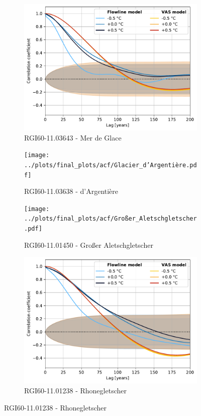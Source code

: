 \begin{figure}[htp]
        \begin{subfigure}[b]{0.48\textwidth}
          \caption{RGI60-11.03643 - Mer de Glace}
          \label{fig:acf:mer_de_glace}
          \centering
          \includegraphics[width=\textwidth]{../plots/final_plots/acf/Mer_de_Glace.pdf}
        \end{subfigure}
        \hfill
        \begin{subfigure}[b]{0.48\textwidth}
          \caption{RGI60-11.03638 - d'Argentière}
          \label{fig:acf:glacier_d_argentiere}
          \centering
          \texttt{[image: ../plots/final\_plots/acf/Glacier\_d'Argentière.pdf]}
        \end{subfigure}

        \begin{subfigure}[b]{0.48\textwidth}
          \caption{RGI60-11.01450 - Großer Aletschgletscher}
          \label{fig:acf:großer_aletschgletscher}
          \centering
          \texttt{[image: ../plots/final\_plots/acf/Großer\_Aletschgletscher.pdf]}
        \end{subfigure}
        \hfill
        \begin{subfigure}[b]{0.48\textwidth}
          \caption{RGI60-11.01238 - Rhonegletscher}
          \label{fig:acf:rhonegletscher}
          \centering
          \includegraphics[width=\textwidth]{../plots/final_plots/acf/Rhonegletscher.pdf}
        \end{subfigure}


\end{figure}

